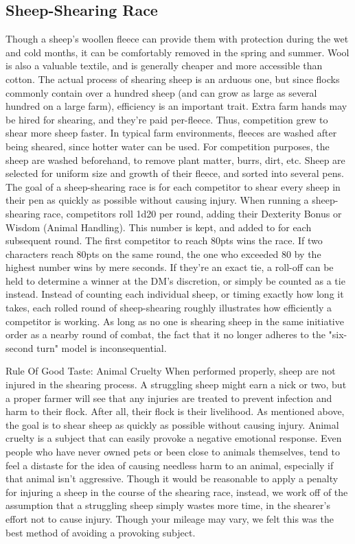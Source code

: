 \documentclass[10pt,a4paper,twoside,twocolumn,openany,bg=print,nodeprecatedcode]{dndbook}
\begin{document}
\subsection{Sheep-Shearing Race}
Though a sheep's woollen fleece can provide them with protection during the wet and cold months, it can be comfortably removed in the spring and summer. Wool is also a valuable textile, and is generally cheaper and more accessible than cotton.
The actual process of shearing sheep is an arduous one, but since flocks commonly contain over a hundred sheep (and can grow as large as several hundred on a large farm), efficiency is an important trait. Extra farm hands may be hired for shearing, and they're paid per-fleece. Thus, competition grew to shear more sheep faster.
In typical farm environments, fleeces are washed after being sheared, since hotter water can be used. For competition purposes, the sheep are washed beforehand, to remove plant matter, burrs, dirt, etc. Sheep are selected for uniform size and growth of their fleece, and sorted into several pens. The goal of a sheep-shearing race is for each competitor to shear every sheep in their pen as quickly as possible without causing injury.
When running a sheep-shearing race, competitors roll 1d20 per round, adding their Dexterity Bonus or Wisdom (Animal Handling). This number is kept, and added to for each subsequent round. The first competitor to reach 80pts wins the race. If two characters reach 80pts on the same round, the one who exceeded 80 by the highest number wins by mere seconds. If they're an exact tie, a roll-off can be held to determine a winner at the DM's discretion, or simply be counted as a tie instead.
Instead of counting each individual sheep, or timing exactly how long it takes, each rolled round of sheep-shearing roughly illustrates how efficiently a competitor is working. As long as no one is shearing sheep in the same initiative order as a nearby round of combat, the fact that it no longer adheres to the "six-second turn" model is inconsequential.
\begin{DndComment}{Rule Of Good Taste: Animal Cruelty}
When performed properly, sheep are not injured in the shearing process. A struggling sheep might earn a nick or two, but a proper farmer will see that any injuries are treated to prevent infection and harm to their flock. After all, their flock is their livelihood. As mentioned above, the goal is to shear sheep as quickly as possible without causing injury.
Animal cruelty is a subject that can easily provoke a negative emotional response. Even people who have never owned pets or been close to animals themselves, tend to feel a distaste for the idea of causing needless harm to an animal, especially if that animal isn't aggressive. Though it would be reasonable to apply a penalty for injuring a sheep in the course of the shearing race, instead, we work off of the assumption that a struggling sheep simply wastes more time, in the shearer's effort not to cause injury. Though your mileage may vary, we felt this was the best method of avoiding a provoking subject.
\end{DndComment}
\end{document}
